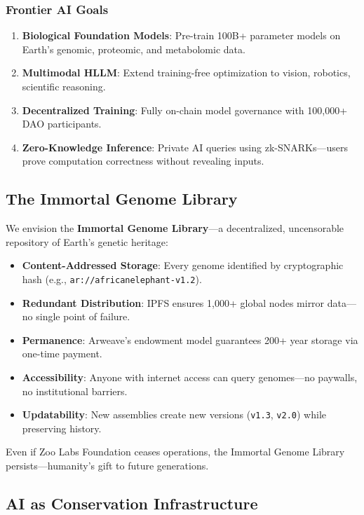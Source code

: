 \subsubsection{Frontier AI Goals}
\begin{enumerate}
    \item \textbf{Biological Foundation Models}: Pre-train 100B+ parameter models on Earth's genomic, proteomic, and metabolomic data.
    \item \textbf{Multimodal HLLM}: Extend training-free optimization to vision, robotics, scientific reasoning.
    \item \textbf{Decentralized Training}: Fully on-chain model governance with 100,000+ DAO participants.
    \item \textbf{Zero-Knowledge Inference}: Private AI queries using zk-SNARKs—users prove computation correctness without revealing inputs.
\end{enumerate}

\subsection{The Immortal Genome Library}

We envision the \textbf{Immortal Genome Library}—a decentralized, uncensorable repository of Earth's genetic heritage:

\begin{itemize}
    \item \textbf{Content-Addressed Storage}: Every genome identified by cryptographic hash (e.g., \texttt{ar://africanelephant-v1.2}).
    \item \textbf{Redundant Distribution}: IPFS ensures 1,000+ global nodes mirror data—no single point of failure.
    \item \textbf{Permanence}: Arweave's endowment model guarantees 200+ year storage via one-time payment.
    \item \textbf{Accessibility}: Anyone with internet access can query genomes—no paywalls, no institutional barriers.
    \item \textbf{Updatability}: New assemblies create new versions (\texttt{v1.3}, \texttt{v2.0}) while preserving history.
\end{itemize}

Even if Zoo Labs Foundation ceases operations, the Immortal Genome Library persists—humanity's gift to future generations.

\subsection{AI as Conservation Infrastructure}


